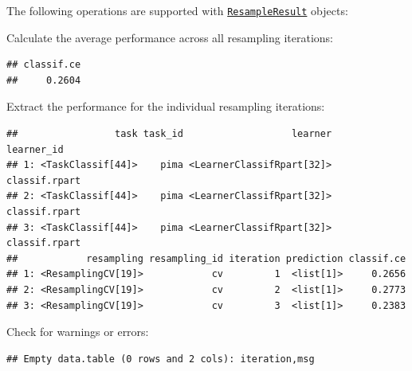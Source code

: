 \documentclass[]{scrbook}
\newenvironment{Shaded}{\begin{snugshade}}{\end{snugshade}}
\newcommand{\KeywordTok}[1]{\textcolor[rgb]{0.13,0.29,0.53}{\textbf{#1}}}
\newcommand{\NormalTok}[1]{#1}
\newcommand{\OperatorTok}[1]{\textcolor[rgb]{0.81,0.36,0.00}{\textbf{#1}}}
\newcommand{\StringTok}[1]{\textcolor[rgb]{0.31,0.60,0.02}{#1}}
\renewenvironment{Shaded} {\begin{snugshade}\small} {\end{snugshade}}
\begin{document}
The following operations are supported with \href{https://mlr3.mlr-org.com/reference/ResampleResult.html}{\texttt{ResampleResult}} objects:

Calculate the average performance across all resampling iterations:

\begin{Shaded}
\end{Shaded}

\begin{verbatim}
## classif.ce 
##     0.2604
\end{verbatim}

Extract the performance for the individual resampling iterations:

\begin{Shaded}
\end{Shaded}

\begin{verbatim}
##                 task task_id                   learner    learner_id
## 1: <TaskClassif[44]>    pima <LearnerClassifRpart[32]> classif.rpart
## 2: <TaskClassif[44]>    pima <LearnerClassifRpart[32]> classif.rpart
## 3: <TaskClassif[44]>    pima <LearnerClassifRpart[32]> classif.rpart
##            resampling resampling_id iteration prediction classif.ce
## 1: <ResamplingCV[19]>            cv         1  <list[1]>     0.2656
## 2: <ResamplingCV[19]>            cv         2  <list[1]>     0.2773
## 3: <ResamplingCV[19]>            cv         3  <list[1]>     0.2383
\end{verbatim}

Check for warnings or errors:

\begin{Shaded}
\end{Shaded}

\begin{verbatim}
## Empty data.table (0 rows and 2 cols): iteration,msg
\end{verbatim}
\end{document}
